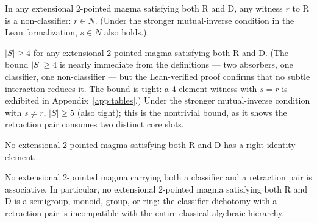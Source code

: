 \documentclass[sigconf,screen,review,anonymous]{acmart}
\theoremstyle{remark}
\begin{document}
\begin{theorem}
\label{thm:placement}
In any extensional 2-pointed magma satisfying both R and D, any witness $r$ to R is a non-classifier: $r \in N$. (Under the stronger mutual-inverse condition in the Lean formalization, $s \in N$ also holds.)
\end{theorem}

\begin{theorem}
\label{thm:card}
$|S| \geq 4$ for any extensional 2-pointed magma satisfying both R and D. (The bound $|S| \geq 4$ is nearly immediate from the definitions --- two absorbers, one classifier, one non-classifier --- but the Lean-verified proof confirms that no subtle interaction reduces it. The bound is tight: a 4-element witness with $s = r$ is exhibited in Appendix~\ref{app:tables}.) Under the stronger mutual-inverse condition with $s \neq r$, $|S| \geq 5$ (also tight); this is the nontrivial bound, as it shows the retraction pair consumes two distinct core slots.
\end{theorem}

\begin{theorem}
\label{thm:no-rid}
No extensional 2-pointed magma satisfying both R and D has a right identity element.
\end{theorem}

\begin{theorem}[No Associativity]
\label{thm:no-assoc}
No extensional 2-pointed magma carrying both a classifier and a retraction pair is associative. In particular, no extensional 2-pointed magma satisfying both R and D is a semigroup, monoid, group, or ring: the classifier dichotomy with a retraction pair is incompatible with the entire classical algebraic hierarchy.
\end{theorem}
\end{document}
